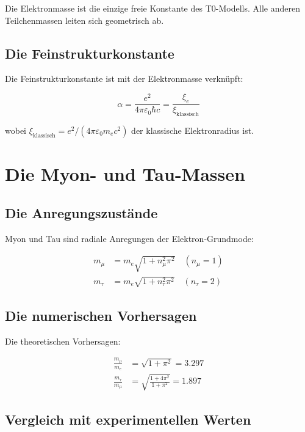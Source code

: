 \documentclass[12pt,a4paper]{report}
\begin{document}
	Die Elektronmasse ist die einzige freie Konstante des T0-Modells. Alle anderen Teilchenmassen leiten sich geometrisch ab.
	
	\subsection{Die Feinstrukturkonstante}
	
	Die Feinstrukturkonstante ist mit der Elektronmasse verknüpft:
	
	\begin{equation}
		\alpha = \frac{e^2}{4\pi\varepsilon_0\hbar c} = \frac{\xi_e}{\xi_{\text{klassisch}}}
	\end{equation}
	
	wobei $\xi_{\text{klassisch}} = e^2/(4\pi\varepsilon_0 m_e c^2)$ der klassische Elektronradius ist.
	
	\section{Die Myon- und Tau-Massen}
	
	\subsection{Die Anregungszustände}
	
	Myon und Tau sind radiale Anregungen der Elektron-Grundmode:
	
	\begin{align}
		m_\mu &= m_e \sqrt{1 + n_\mu^2\pi^2} \quad (n_\mu = 1) \\
		m_\tau &= m_e \sqrt{1 + n_\tau^2\pi^2} \quad (n_\tau = 2)
	\end{align}
	
	\subsection{Die numerischen Vorhersagen}
	
	Die theoretischen Vorhersagen:
	
	\begin{align}
		\frac{m_\mu}{m_e} &= \sqrt{1 + \pi^2} = 3.297 \\
		\frac{m_\tau}{m_\mu} &= \sqrt{\frac{1 + 4\pi^2}{1 + \pi^2}} = 1.897
	\end{align}
	
	\subsection{Vergleich mit experimentellen Werten}
	
\end{document}
